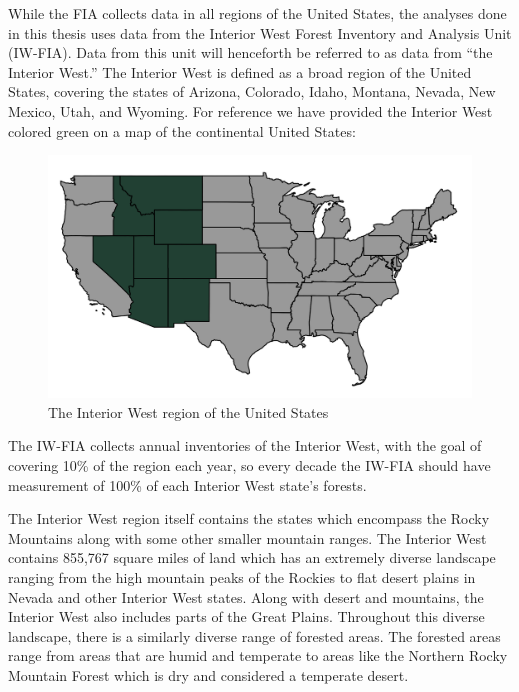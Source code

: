 \documentclass[12pt,twoside]{reedthesis}
\begin{document}
While the FIA collects data in all regions of the United States, the analyses done in this thesis uses data from the Interior West Forest Inventory and Analysis Unit (IW-FIA). Data from this unit will henceforth be referred to as data from ``the Interior West.'' The Interior West is defined as a broad region of the United States, covering the states of Arizona, Colorado, Idaho, Montana, Nevada, New Mexico, Utah, and Wyoming. For reference we have provided the Interior West colored green on a map of the continental United States:
\begin{figure}

{\centering \includegraphics[width=1\linewidth]{figure/interior-west-on-usa} 

}

\caption{The Interior West region of the United States}\label{fig:unnamed-chunk-3}
\end{figure}
The IW-FIA collects annual inventories of the Interior West, with the goal of covering 10\% of the region each year, so every decade the IW-FIA should have measurement of 100\% of each Interior West state's forests.

The Interior West region itself contains the states which encompass the Rocky Mountains along with some other smaller mountain ranges. The Interior West contains 855,767 square miles of land which has an extremely diverse landscape ranging from the high mountain peaks of the Rockies to flat desert plains in Nevada and other Interior West states. Along with desert and mountains, the Interior West also includes parts of the Great Plains. Throughout this diverse landscape, there is a similarly diverse range of forested areas. The forested areas range from areas that are humid and temperate to areas like the Northern Rocky Mountain Forest which is dry and considered a temperate desert.
\end{document}
